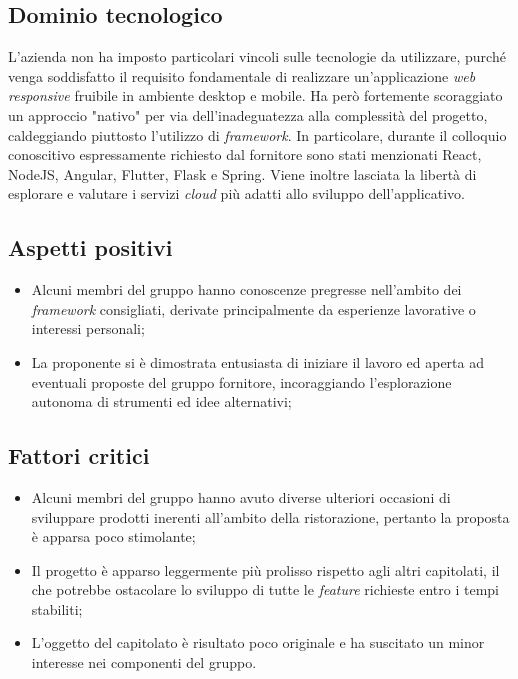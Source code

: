 \subsection{Dominio tecnologico}
L'azienda non ha imposto particolari vincoli sulle tecnologie da utilizzare, purché venga soddisfatto il requisito fondamentale di realizzare un'applicazione \textit{web responsive} fruibile in ambiente desktop e mobile. Ha però fortemente scoraggiato un approccio "nativo" per via dell'inadeguatezza alla complessità del progetto, caldeggiando piuttosto l'utilizzo di \textit{framework}. In particolare, durante il colloquio conoscitivo espressamente richiesto dal fornitore sono stati menzionati React, NodeJS, Angular, Flutter, Flask e Spring. Viene inoltre lasciata la libertà di esplorare e valutare i servizi \textit{cloud} più adatti allo sviluppo dell'applicativo. 

\subsection{Aspetti positivi}
\begin{itemize}
    \setlength\itemsep{0em}
    \item Alcuni membri del gruppo hanno conoscenze pregresse nell'ambito dei \textit{framework} consigliati, derivate principalmente da esperienze lavorative o interessi personali;
    \item La proponente si è dimostrata entusiasta di iniziare il lavoro ed aperta ad eventuali proposte del gruppo fornitore, incoraggiando l'esplorazione autonoma di strumenti ed idee alternativi;
\end{itemize}

\subsection{Fattori critici}
\begin{itemize}
    \setlength\itemsep{0em}
    \item Alcuni membri del gruppo hanno avuto diverse ulteriori occasioni di sviluppare prodotti inerenti all'ambito della ristorazione, pertanto la proposta è apparsa poco stimolante;    
    \item Il progetto è apparso leggermente più prolisso rispetto agli altri capitolati, il che potrebbe ostacolare lo sviluppo di tutte le \textit{feature} richieste entro i tempi stabiliti;
    \item L'oggetto del capitolato è risultato poco originale e ha suscitato un minor interesse nei componenti del gruppo.
\end{itemize}

